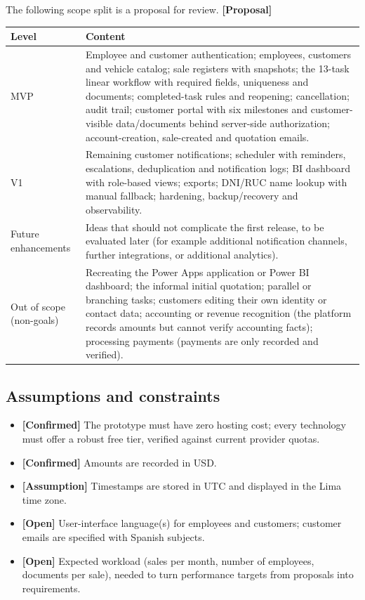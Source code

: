 \documentclass[11pt,a4paper]{article}
\newcommand{\tagconf}{\textcolor{green!45!black}{\textbf{[Confirmed]}}}
\newcommand{\tagprop}{\textcolor{orange!80!black}{\textbf{[Proposal]}}}
\newcommand{\tagassm}{\textcolor{blue!60!black}{\textbf{[Assumption]}}}
\newcommand{\tagopen}{\textcolor{red!70!black}{\textbf{[Open]}}}
\begin{document}
The following scope split is a proposal for review. \tagprop{}

\begin{longtable}{@{}L{3.0cm}L{12.8cm}@{}}
	\toprule
	\textbf{Level}           & \textbf{Content}
	\\
	\midrule
	\endhead
	MVP                      & Employee and customer authentication; employees,
	customers and vehicle catalog; sale registers with snapshots; the 13-task
	linear
	workflow with required fields, uniqueness and documents; completed-task rules
	and reopening; cancellation; audit trail; customer portal with six milestones
	and customer-visible data/documents behind server-side authorization;
	account-creation, sale-created and quotation emails.
	\\
	V1                       & Remaining customer notifications; scheduler with
	reminders, escalations, deduplication and notification logs; BI dashboard with
	role-based views; exports; DNI/RUC name lookup with manual fallback; hardening,
	backup/recovery and observability.
	\\
	Future enhancements      & Ideas that should not complicate the first release,
	to be
	evaluated later (for example additional notification channels, further
	integrations, or additional analytics).
	\\
	Out of scope (non-goals) & Recreating the Power Apps application or Power BI
	dashboard; the informal initial quotation; parallel or branching tasks;
	customers editing their own identity or contact data; accounting or revenue
	recognition (the platform records amounts but cannot verify accounting facts);
	processing payments (payments are only recorded and verified).
	\\
	\bottomrule
\end{longtable}

\subsection{Assumptions and constraints}

\begin{itemize}
	\item \tagconf{} The prototype must have zero hosting cost; every technology
	      must offer a robust free tier, verified against current provider quotas.
	\item \tagconf{} Amounts are recorded in USD.
	\item \tagassm{} Timestamps are stored in UTC and displayed in the Lima time
	      zone.
	\item \tagopen{} User-interface language(s) for employees and customers;
	      customer emails are specified with Spanish subjects.
	\item \tagopen{} Expected workload (sales per month, number of employees,
	      documents per sale), needed to turn performance targets from proposals
	      into
	      requirements.
\end{itemize}
\end{document}
